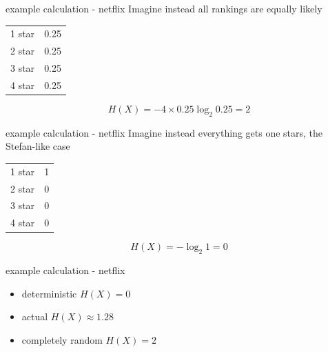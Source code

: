 \documentclass{beamer}
\newcommand{\crish}{\color{reddish}}
\newcommand{\cbla}{\color{black}}
\begin{document}
\begin{frame}{example calculation - netflix}
  Imagine instead all rankings are equally likely
    \begin{center}
    \begin{tabular}{l|l}
      \hline
      1 star&0.25\\
      2 star&0.25\\
      3 star&0.25\\
      4 star&0.25\\
      \hline
    \end{tabular}
  \end{center}
  \crish
  $$
H(X)=-4\times 0.25\log_2{0.25}=2
  $$
\cbla
\end{frame}  


\begin{frame}{example calculation - netflix}
  Imagine instead everything gets one stars, the Stefan-like case
    \begin{center}
    \begin{tabular}{l|l}
      \hline
      1 star&1\\
      2 star&0\\
      3 star&0\\
      4 star&0\\
      \hline
    \end{tabular}
  \end{center}
  \crish
  $$
H(X)=-\log_2{1}=0
  $$
\cbla
\end{frame}

\begin{frame}{example calculation - netflix}
  \begin{itemize}
  \item deterministic \crish $H(X)=0$\cbla
  \item actual \crish $H(X)\approx 1.28$\cbla
  \item completely random \crish $H(X)=2$\cbla
\end{itemize}
\end{frame}
\end{document}
